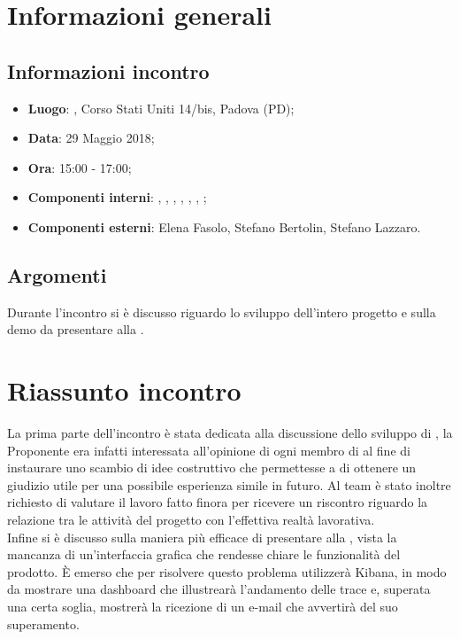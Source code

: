 \section{Informazioni generali}

	\subsection{Informazioni incontro}
		\begin{itemize}
			\item \textbf{Luogo}: \Proponente{}, Corso Stati Uniti 14/bis, Padova (PD);
			\item \textbf{Data}: 29 Maggio 2018;
			\item \textbf{Ora}: 15:00 - 17:00;
			\item \textbf{Componenti interni}: \Tommaso, \Mattia, \Isacco, \Luca, \Leonardo, \Cristian, \Carlo;
			\item \textbf{Componenti esterni}: Elena Fasolo, Stefano Bertolin, Stefano Lazzaro.
		\end{itemize}

	\subsection{Argomenti}
		Durante l'incontro si è discusso riguardo lo sviluppo dell'intero progetto \ProjectName{} e 
		sulla demo da presentare alla \RA{}.

\section{Riassunto incontro}
	La prima parte dell'incontro è stata dedicata alla discussione dello sviluppo di \ProjectName{}, 
	la Proponente era infatti interessata all'opinione di ogni membro di \GroupName{} al fine 
	di instaurare uno scambio di idee costruttivo che permettesse a \Proponente{} di ottenere un 
	giudizio utile per una possibile esperienza simile in futuro. Al team è stato inoltre richiesto di valutare 
	il lavoro fatto finora per ricevere un riscontro riguardo la relazione tra le attività 
	del progetto con l'effettiva realtà lavorativa.\\
	Infine si è discusso sulla maniera più efficace di presentare \ProjectName{} alla \RA{}, 
	vista la mancanza di un'interfaccia grafica che rendesse chiare le funzionalità del prodotto.
	È emerso che per risolvere questo problema \GroupName{} utilizzerà Kibana, in modo
	da mostrare una dashboard che illustrearà l'andamento delle trace e, superata una certa soglia,
	mostrerà la ricezione di un e-mail che avvertirà del suo superamento.


